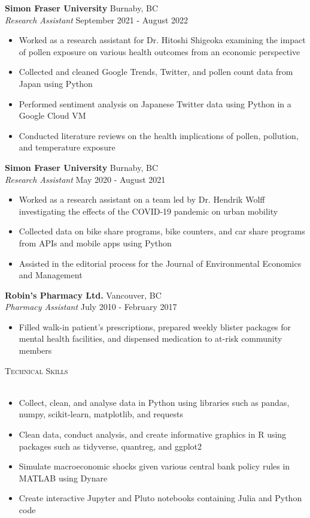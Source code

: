 \documentclass[]{article}
\newcommand{\lineunder} {
    \vspace*{-8pt} \\
    \hspace*{-18pt} \hrulefill \\
}
\newcommand{\header} [1] {
    {\hspace*{-18pt}\vspace*{6pt} \textsc{#1}}
    \vspace*{-6pt} \lineunder
}
\begin{document}
\textbf{Simon Fraser University} \hfill Burnaby, BC\\
\textit{Research Assistant} \hfill September 2021 - August 2022\\
\begin{itemize}
    \item Worked as a research assistant for Dr. Hitoshi Shigeoka examining the impact of pollen exposure on various health outcomes from an economic perspective
    \item Collected and cleaned Google Trends, Twitter, and pollen count data from Japan using Python 
    \item Performed sentiment analysis on Japanese Twitter data using Python in a Google Cloud VM
    \item Conducted literature reviews on the health implications of pollen, pollution, and temperature exposure
\end{itemize}

\textbf{Simon Fraser University} \hfill Burnaby, BC\\
\textit{Research Assistant} \hfill May 2020 - August 2021\\
\begin{itemize}
    \item Worked as a research assistant on a team led by Dr. Hendrik Wolff investigating the effects of the COVID-19 pandemic on urban mobility
    \item Collected data on bike share programs, bike counters, and car share programs from APIs and mobile apps using Python
    \item Assisted in the editorial process for the Journal of Environmental Economics and Management
\end{itemize}

\textbf{Robin's Pharmacy Ltd.} \hfill Vancouver, BC\\
\textit{Pharmacy Assistant} \hfill July 2010 - February 2017\\
\begin{itemize}
    \item Filled walk-in patient’s prescriptions, prepared weekly blister packages for mental health facilities, and dispensed medication to at-risk community members
\end{itemize}

\header{Technical Skills}
\begin{itemize}
    \item Collect, clean, and analyse data in Python using libraries such as pandas, numpy, scikit-learn, matplotlib, and requests
    \item Clean data, conduct analysis, and create informative graphics in R using packages such as tidyverse, quantreg, and ggplot2
    \item Simulate macroeconomic shocks given various central bank policy rules in MATLAB using Dynare
    \item Create interactive Jupyter and Pluto notebooks containing Julia and Python code
\end{itemize}
\end{document}
